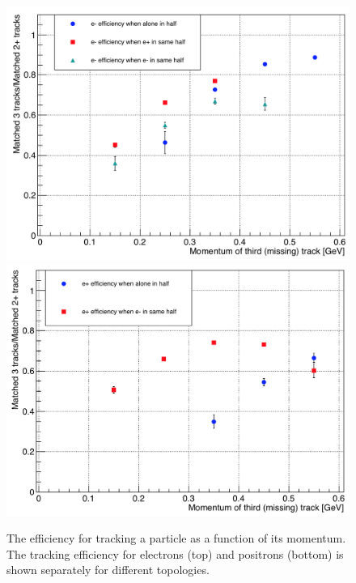 \begin{figure}[hbt]
\begin{minipage}{0.55\textwidth}
	  \includegraphics[width=\textwidth]{pics/performance/em_trkEff.png}
    	  \includegraphics[width=\textwidth]{pics/performance/ep_trkEff.png}
\end{minipage}\hfill\begin{minipage}{0.32\textwidth}
\caption[Tracking efficiency from three particle final state events]{ \label{fig:eff3prong} \baselineskip 11pt
{The efficiency for tracking a particle as a function of its momentum. The tracking efficiency for electrons (top) and positrons (bottom) is shown separately for different topologies.}
}
\end{minipage}
\end{figure}

